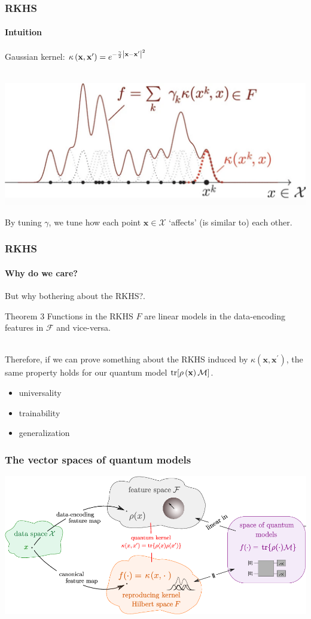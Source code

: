 \documentclass[aspectratio=43]{beamer}
\newcommand{\kernel}[2]{\kappa\left( #1, #2 \right)}
\begin{document}
\begin{frame}
  \frametitle{RKHS}
  \framesubtitle{Intuition}

  Gaussian kernel: $\kernel{\mathbf{x}}{\mathbf{x}^\prime} = e^{-\frac{\gamma}{2}\abs{\mathbf{x}-\mathbf{x}^\prime}^2}$

  \ \\
  \centering
  \includegraphics[width=.5\textwidth]{pics/schuld-rkhs-intuitive.png}

  By tuning $\gamma$, we tune how each point $\mathbf{x}\in \mathcal{X}$ `affects' (is similar to) each other.

\end{frame}


\begin{frame}
  \frametitle{RKHS}
  \framesubtitle{Why do we care?}

  But why bothering about the RKHS?.

  \begin{block}{Theorem 3}
    Functions in the RKHS $F$ are linear models in the data-encoding features in $\mathcal{F}$ and vice-versa.
  \end{block}

  \ \\
  Therefore, if we can prove something about the RKHS induced by $\kappa\left( \mathbf{x}, \mathbf{x}^\prime\right)$, the same property holds for our quantum model $\tr[\rho\left( \mathbf{x} \right)\mathcal{M}]$.
  \begin{itemize}
    \item universality
    \item trainability
    \item generalization
  \end{itemize}

\end{frame}


\begin{frame}
  \frametitle{The vector spaces of quantum models}

  \centering
  \includegraphics[width=\textwidth]{pics/schuld-overview.png}

\end{frame}
\end{document}
